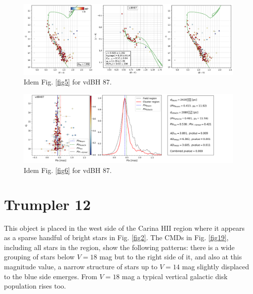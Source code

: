\documentclass[draft]{aa}
\begin{document}
\begin{figure}[ht]
    \centering
    \includegraphics[width=\hsize]{../figs/cmds_vdbh87.png}
    \caption{Idem Fig. \ref{fig5} for vdBH 87.}
    \label{fig17}
\end{figure}
\begin{figure}[ht]
    \centering
    \includegraphics[width=\hsize]{../figs/plx_vdBH87.png}
    \caption{Idem Fig. \ref{fig6} for vdBH 87.}
    \label{fig18}
\end{figure}




\section{Trumpler 12}

This object is placed in the west side of the Carina HII region where it appears
as a sparse handful of bright stars in Fig. \ref{fig2}. The CMDs in Fig.
\ref{fig19}, including all stars in the region, show the following patterns:
there is a wide grouping of stars below $V = 18$ mag but to the right side of
it, and also at this magnitude value, a narrow structure of stars up to $V= 14$
mag slightly displaced to the blue side emerges. From $V = 18$ mag a typical
vertical galactic disk population rises too.\\
\end{document}
